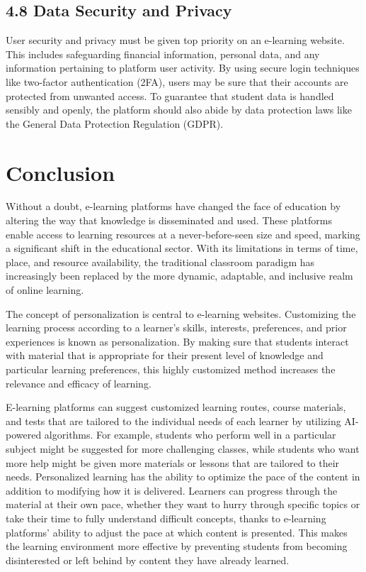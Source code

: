 \documentclass[BTech]{audiss}
\begin{document}
\subsection{4.8 Data Security and Privacy}
User security and privacy must be given top priority on an e-learning website. This includes safeguarding financial information, personal data, and any information pertaining to platform user activity. By using secure login techniques like two-factor authentication (2FA), users may be sure that their accounts are protected from unwanted access. To guarantee that student data is handled sensibly and openly, the platform should also abide by data protection laws like the General Data Protection Regulation (GDPR).

\section{Conclusion}
Without a doubt, e-learning platforms have changed the face of education by altering the way that knowledge is disseminated and used. These platforms enable access to learning resources at a never-before-seen size and speed, marking a significant shift in the educational sector. With its limitations in terms of time, place, and resource availability, the traditional classroom paradigm has increasingly been replaced by the more dynamic, adaptable, and inclusive realm of online learning.

The concept of personalization is central to e-learning websites. Customizing the learning process according to a learner's skills, interests, preferences, and prior experiences is known as personalization. By making sure that students interact with material that is appropriate for their present level of knowledge and particular learning preferences, this highly customized method increases the relevance and efficacy of learning.

E-learning platforms can suggest customized learning routes, course materials, and tests that are tailored to the individual needs of each learner by utilizing AI-powered algorithms. For example, students who perform well in a particular subject might be suggested for more challenging classes, while students who want more help might be given more materials or lessons that are tailored to their needs. Personalized learning has the ability to optimize the pace of the content in addition to modifying how it is delivered. Learners can progress through the material at their own pace, whether they want to hurry through specific topics or take their time to fully understand difficult concepts, thanks to e-learning platforms' ability to adjust the pace at which content is presented. This makes the learning environment more effective by preventing students from becoming disinterested or left behind by content they have already learned.
\end{document}
